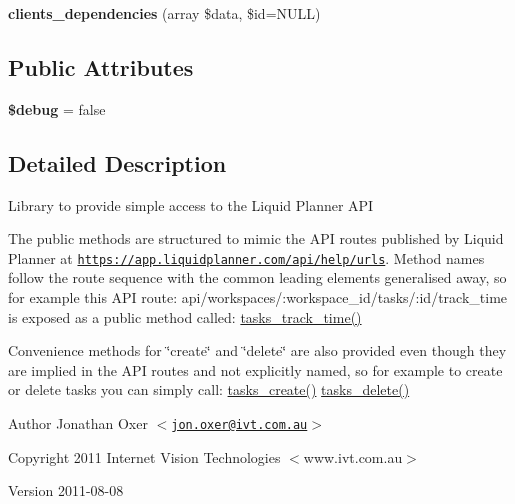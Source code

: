 \begin{DoxyCompactItemize}
\item 
\hypertarget{classLiquidPlanner_a232a622b6339974506a11ec8078aaf26}{{\bfseries clients\-\_\-dependencies} (array \$data, \$id=\-N\-U\-L\-L)}\label{classLiquidPlanner_a232a622b6339974506a11ec8078aaf26}

\end{DoxyCompactItemize}
\subsection*{\-Public \-Attributes}
\begin{DoxyCompactItemize}
\item 
\hypertarget{classLiquidPlanner_a8eb5aea2649614e74eb5fcbfafc577b5}{{\bfseries \$debug} = false}\label{classLiquidPlanner_a8eb5aea2649614e74eb5fcbfafc577b5}

\end{DoxyCompactItemize}


\subsection{\-Detailed \-Description}
\-Library to provide simple access to the \-Liquid \-Planner \-A\-P\-I

\-The public methods are structured to mimic the \-A\-P\-I routes published by \-Liquid \-Planner at \href{https://app.liquidplanner.com/api/help/urls}{\tt https\-://app.\-liquidplanner.\-com/api/help/urls}. \-Method names follow the route sequence with the common leading elements generalised away, so for example this \-A\-P\-I route\-: api/workspaces/\-:workspace\-\_\-id/tasks/\-:id/track\-\_\-time is exposed as a public method called\-: \hyperlink{classLiquidPlanner_afaddde49d5ccb8388bc811cbd24bafd9}{tasks\-\_\-track\-\_\-time()}

\-Convenience methods for \char`\"{}create\char`\"{} and \char`\"{}delete\char`\"{} are also provided even though they are implied in the \-A\-P\-I routes and not explicitly named, so for example to create or delete tasks you can simply call\-: \hyperlink{classLiquidPlanner_a91a8d60f702c9b774e292c734df4f47f}{tasks\-\_\-create()} \hyperlink{classLiquidPlanner_adb51bedafa48a1945b20a3a546521bb5}{tasks\-\_\-delete()}

\begin{DoxyAuthor}{\-Author}
\-Jonathan \-Oxer $<$\href{mailto:jon.oxer@ivt.com.au}{\tt jon.\-oxer@ivt.\-com.\-au}$>$ 
\end{DoxyAuthor}
\begin{DoxyCopyright}{\-Copyright}
2011 \-Internet \-Vision \-Technologies $<$www.\-ivt.\-com.\-au$>$ 
\end{DoxyCopyright}
\begin{DoxyVersion}{\-Version}
2011-\/08-\/08 
\end{DoxyVersion}



